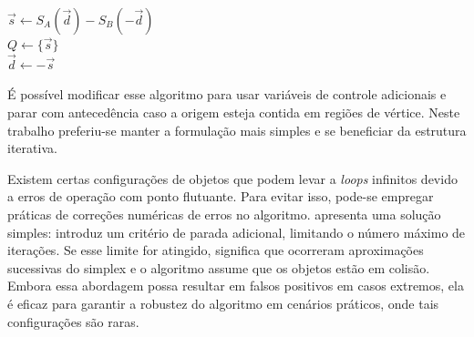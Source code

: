 \begin{algorithm}[htb]
	\caption{BGJK}

	$\vec s \leftarrow S_A(\vec d) - S_B(-\vec d)$ \\
	$Q \leftarrow \{\vec s\}$ \\
	$\vec d \leftarrow -\vec s$ \\
	

	\label{alg:bgjk}
\end{algorithm}

É possível modificar esse algoritmo para usar variáveis de controle adicionais e parar com antecedência  caso a origem esteja contida em regiões de vértice. Neste trabalho preferiu-se manter a formulação mais simples e se beneficiar da estrutura iterativa.

Existem certas configurações de objetos que podem levar a \textit{loops} infinitos devido a erros de operação com ponto flutuante. Para evitar isso, pode-se empregar práticas de correções numéricas de erros no algoritmo.  apresenta uma solução simples: introduz um critério de parada adicional, limitando o número máximo de iterações. Se esse limite for atingido, significa que ocorreram aproximações sucessivas do simplex e o algoritmo assume que os objetos estão em colisão. Embora essa abordagem possa resultar em falsos positivos em casos extremos, ela é eficaz para garantir a robustez do algoritmo em cenários práticos, onde tais configurações são raras.
